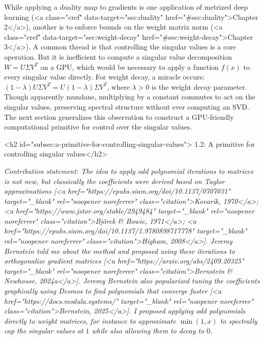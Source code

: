 While applying a duality map to gradients is one application of metrized deep learning (<a class="cref" data-target="sec:duality" href="#sec:duality">Chapter 2</a>), another is to enforce bounds on the weight matrix norm (<a class="cref" data-target="sec:weight-decay" href="#sec:weight-decay">Chapter 3</a>). A common thread is that controlling the singular values is a core operation. But it is inefficient to compute a singular value decomposition $W = U \Sigma V^T$ on a GPU, which would be necessary to apply a function $f(x)$ to every singular value directly. For weight decay, a miracle occurs: $(1-\lambda) U \Sigma V^T = U (1-\lambda) \Sigma V^T$, where $\lambda > 0$ is the weight decay parameter. Though apparently mundane, multiplying by a constant commutes to act on the singular values, preserving spectral structure without ever computing an SVD. The next section generalizes this observation to construct a GPU-friendly computational primitive for control over the singular values.

<h2 id="subsec:a-primitive-for-controlling-singular-values"> 1.2: A primitive for controlling singular values</h2>

\textit{Contribution statement: The idea to apply odd polynomial iterations to matrices is not new, but classically the coefficients were derived based on Taylor approximations [<a href="https://epubs.siam.org/doi/10.1137/0707031" target="_blank" rel="noopener noreferrer" class="citation">Kovarik, 1970</a>; <a href="https://www.jstor.org/stable/2949484" target="_blank" rel="noopener noreferrer" class="citation">Björck & Bowie, 1971</a>; <a href="https://epubs.siam.org/doi/10.1137/1.9780898717778" target="_blank" rel="noopener noreferrer" class="citation">Higham, 2008</a>]. Jeremy Bernstein told me about the method and proposed using these iterations to orthogonalize gradient matrices [<a href="https://arxiv.org/abs/2409.20325" target="_blank" rel="noopener noreferrer" class="citation">Bernstein & Newhouse, 2024a</a>]. Jeremy Bernstein also popularized tuning the coefficients graphically using Desmos to find polynomials that converge faster [<a href="https://docs.modula.systems/" target="_blank" rel="noopener noreferrer" class="citation">Bernstein, 2025</a>]. I proposed applying odd polynomials directly to weight matrices, for instance to approximate $\min(1, x)$ to spectrally cap the singular values at $1$ while also allowing them to decay to $0$.}

\vspace{0.5em}

